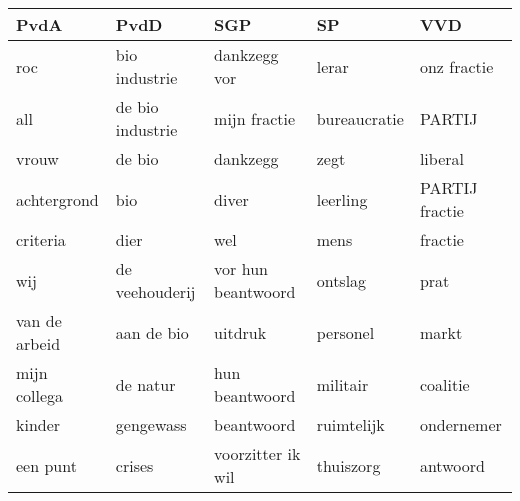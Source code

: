 \begin{tabular}{lllll}
\toprule
          PvdA &              PvdD &                 SGP &            SP &             VVD \\
\midrule
           roc &     bio industrie &        dankzegg vor &         lerar &     onz fractie \\
           all &  de bio industrie &        mijn fractie &  bureaucratie &          PARTIJ \\
         vrouw &            de bio &            dankzegg &          zegt &         liberal \\
   achtergrond &               bio &               diver &      leerling &  PARTIJ fractie \\
      criteria &              dier &                 wel &          mens &         fractie \\
           wij &    de veehouderij &  vor hun beantwoord &       ontslag &            prat \\
 van de arbeid &        aan de bio &             uitdruk &      personel &           markt \\
  mijn collega &          de natur &      hun beantwoord &      militair &        coalitie \\
        kinder &         gengewass &          beantwoord &    ruimtelijk &      ondernemer \\
      een punt &            crises &   voorzitter ik wil &     thuiszorg &        antwoord \\
\bottomrule
\end{tabular}
